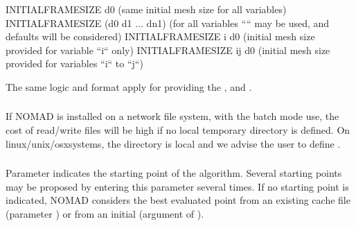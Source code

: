\documentclass[letterpaper,10pt,english]{sphinxmanual}
\begin{document}
\begin{sphinxVerbatim}[commandchars=\\\{\}]
INITIAL\PYGZus{}FRAME\PYGZus{}SIZE     d0 (same initial mesh size for all variables)
INITIAL\PYGZus{}FRAME\PYGZus{}SIZE     (d0 d1 ... dn\PYGZhy{}1) (for all variables ``\PYGZhy{}`` may be used,  and defaults will be considered)
INITIAL\PYGZus{}FRAME\PYGZus{}SIZE i   d0 (initial mesh size provided for variable ``i`` only)
INITIAL\PYGZus{}FRAME\PYGZus{}SIZE i\PYGZhy{}j d0 (initial mesh size provided for variables ``i`` to ``j``)
\end{sphinxVerbatim}

\sphinxAtStartPar
The same logic and format apply for providing the ,  and .


\subsubsection{}
\label{\detokenize{HowToUseNomad:tmp-dir}}\label{\detokenize{HowToUseNomad:id17}}
\sphinxAtStartPar
If NOMAD is installed on a network file system, with the batch mode use,  the cost of read/write files  will be high if no local temporary directory is defined.  On linux/unix/osxsystems, the directory  is  local and we advise the user to define .


\subsubsection{}
\label{\detokenize{HowToUseNomad:x0}}\label{\detokenize{HowToUseNomad:id18}}
\sphinxAtStartPar
Parameter  indicates the starting point of the algorithm. Several starting points may be proposed by entering this parameter several times. If no starting point is indicated, NOMAD considers the best evaluated point from an existing cache file (parameter )  or from an initial  (argument  of ).
\end{document}
